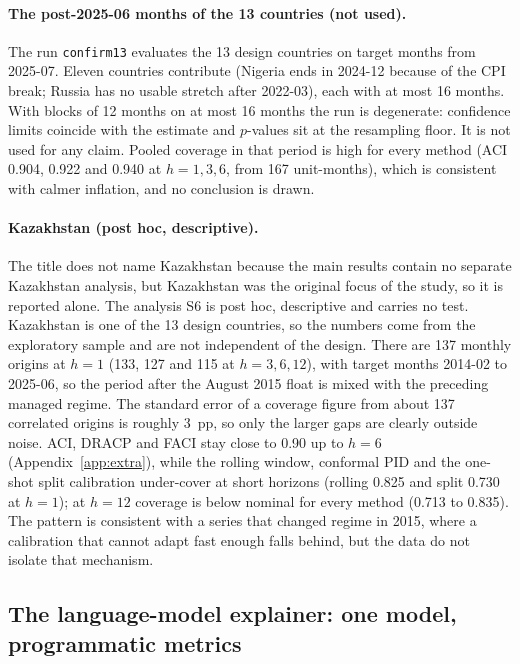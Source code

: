 \paragraph{The post-2025-06 months of the 13 countries (not used).}\label{sec:confirm13} The run \texttt{confirm13} evaluates the 13 design countries on target months from 2025-07. Eleven countries contribute (Nigeria ends in 2024-12 because of the CPI break; Russia has no usable stretch after 2022-03), each with at most 16 months. With blocks of 12 months on at most 16 months the run is degenerate: confidence limits coincide with the estimate and $p$-values sit at the resampling floor. It is not used for any claim. Pooled coverage in that period is high for every method (ACI 0.904, 0.922 and 0.940 at $h=1,3,6$, from 167 unit-months), which is consistent with calmer inflation, and no conclusion is drawn.

\paragraph{Kazakhstan (post hoc, descriptive).}\label{sec:kz} The title does not name Kazakhstan because the main results contain no separate Kazakhstan analysis, but Kazakhstan was the original focus of the study, so it is reported alone. The analysis S6 is post hoc, descriptive and carries no test. Kazakhstan is one of the 13 design countries, so the numbers come from the exploratory sample and are not independent of the design. There are 137 monthly origins at $h=1$ (133, 127 and 115 at $h=3,6,12$), with target months 2014-02 to 2025-06, so the period after the August 2015 float is mixed with the preceding managed regime. The standard error of a coverage figure from about 137 correlated origins is roughly 3~pp, so only the larger gaps are clearly outside noise. ACI, DRACP and FACI stay close to 0.90 up to $h=6$ (Appendix~\ref{app:extra}), while the rolling window, conformal PID and the one-shot split calibration under-cover at short horizons (rolling 0.825 and split 0.730 at $h=1$); at $h=12$ coverage is below nominal for every method (0.713 to 0.835). The pattern is consistent with a series that changed regime in 2015, where a calibration that cannot adapt fast enough falls behind, but the data do not isolate that mechanism.

\subsection{The language-model explainer: one model, programmatic metrics}\label{sec:explainer}

